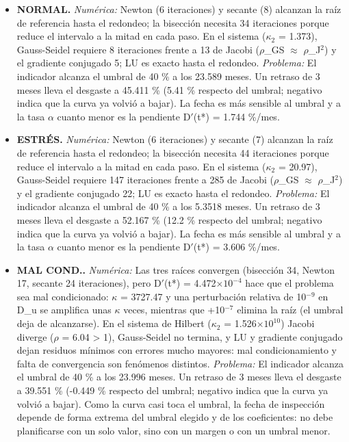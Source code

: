 \begin{itemize}
\item \textbf{NORMAL.} \emph{Numérica:} Newton (6 iteraciones) y secante (8) alcanzan la raíz de referencia hasta el redondeo; la bisección necesita 34 iteraciones porque reduce el intervalo a la mitad en cada paso. En el sistema ($\kappa_{2}$ = 1.373), Gauss-Seidel requiere 8 iteraciones frente a 13 de Jacobi ($\rho$\_GS $\approx$ $\rho$\_J$^{2}$) y el gradiente conjugado 5; LU es exacto hasta el redondeo. \emph{Problema:} El indicador alcanza el umbral de 40 \% a los 23.589 meses. Un retraso de 3 meses lleva el desgaste a 45.411 \% (5.41 \% respecto del umbral; negativo indica que la curva ya volvió a bajar). La fecha es más sensible al umbral y a la tasa $\alpha$ cuanto menor es la pendiente D$'$(t*) = 1.744 \%/mes.
\item \textbf{ESTRÉS.} \emph{Numérica:} Newton (6 iteraciones) y secante (7) alcanzan la raíz de referencia hasta el redondeo; la bisección necesita 44 iteraciones porque reduce el intervalo a la mitad en cada paso. En el sistema ($\kappa_{2}$ = 20.97), Gauss-Seidel requiere 147 iteraciones frente a 285 de Jacobi ($\rho$\_GS $\approx$ $\rho$\_J$^{2}$) y el gradiente conjugado 22; LU es exacto hasta el redondeo. \emph{Problema:} El indicador alcanza el umbral de 40 \% a los 5.3518 meses. Un retraso de 3 meses lleva el desgaste a 52.167 \% (12.2 \% respecto del umbral; negativo indica que la curva ya volvió a bajar). La fecha es más sensible al umbral y a la tasa $\alpha$ cuanto menor es la pendiente D$'$(t*) = 3.606 \%/mes.
\item \textbf{MAL COND..} \emph{Numérica:} Las tres raíces convergen (bisección 34, Newton 17, secante 24 iteraciones), pero D$'$(t*) = 4.472$\times10^{-4}$ hace que el problema sea mal condicionado: $\kappa$ = 3727.47 y una perturbación relativa de 10$^{-9}$ en D\_u se amplifica unas $\kappa$ veces, mientras que +10$^{-7}$ elimina la raíz (el umbral deja de alcanzarse). En el sistema de Hilbert ($\kappa_{2}$ = 1.526$\times10^{10}$) Jacobi diverge ($\rho$ = 6.04 > 1), Gauss-Seidel no termina, y LU y gradiente conjugado dejan residuos mínimos con errores mucho mayores: mal condicionamiento y falta de convergencia son fenómenos distintos. \emph{Problema:} El indicador alcanza el umbral de 40 \% a los 23.996 meses. Un retraso de 3 meses lleva el desgaste a 39.551 \% (-0.449 \% respecto del umbral; negativo indica que la curva ya volvió a bajar). Como la curva casi toca el umbral, la fecha de inspección depende de forma extrema del umbral elegido y de los coeficientes: no debe planificarse con un solo valor, sino con un margen o con un umbral menor.
\end{itemize}
